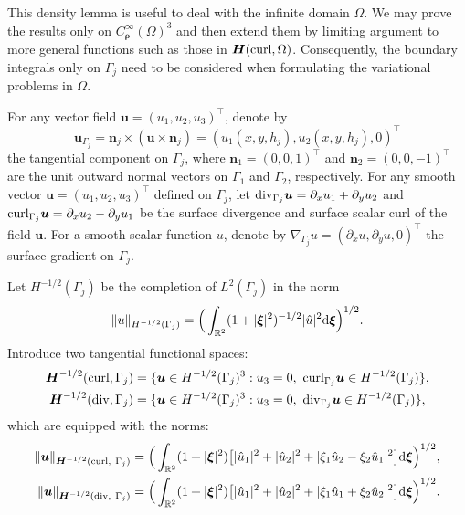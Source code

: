 \documentclass[11pt,reqno]{amsart}
\numberwithin{equation}{section}
\begin{document}
This density lemma is useful to deal with the infinite domain $\Omega$. We may
prove the results only on $ C_{\boldsymbol \rho}^{\infty} (\Omega)^3$ and then
extend them by limiting argument to more general functions such as those in
$\boldsymbol H (\rm curl, \Omega)$. Consequently, the boundary integrals only
on $\Gamma_j$ need to be considered when formulating the variational problems in
$\Omega$.

For any vector field $\boldsymbol u= (u_1, u_2, u_3)^{\top}$, denote by
\[
\boldsymbol u_{\Gamma_j}= \boldsymbol n_j \times( \boldsymbol u \times
\boldsymbol n_j)=(u_1 (x, y, h_j), u_2 (x, y, h_j), 0)^\top
\]
the tangential component on $\Gamma_j$, where $\boldsymbol n_1=(0, 0, 1)^\top$
and $\boldsymbol n_2=(0, 0, -1)^\top$ are the unit outward normal vectors on
$\Gamma_1$ and $\Gamma_2$, respectively. For any smooth vector
$\boldsymbol u=(u_1, u_2, u_3)^\top$ defined on $\Gamma_j$, let ${\rm div
}_{\Gamma_j} \boldsymbol u =\partial_x u_1+\partial_y u_2$ and ${\rm
curl}_{\Gamma_j} \boldsymbol u =\partial_x u_2 -\partial_y u_1$ be the surface
divergence and surface scalar curl of the field $\boldsymbol u$. For a smooth
scalar function $u$, denote by $\nabla_{\Gamma_j} u =(\partial_x u, \partial_y
u, 0)^{\top} $ the surface gradient on $\Gamma_j$. 

Let $H^{-1/2} (\Gamma_j)$ be the completion of $L^2(\Gamma_j)$ in the norm 
\begin{align*}
\|u\|_{H^{-1/2}(\Gamma_j)} =\Big(\int_{\mathbb R^2}(1+|\boldsymbol
\xi|^2)^{-1/2} |\hat u|^2 {\rm d} \boldsymbol \xi\Big)^{1/2}.
\end{align*}
Introduce two tangential functional spaces:
\begin{align*}
\boldsymbol H^{-1/2}({\rm curl}, \Gamma_j) &=\{ \boldsymbol u \in H^{-1/2}
(\Gamma_j)^3: u_3=0, ~{\rm curl }_{\Gamma_j} \boldsymbol u \in H^{-1/2}
(\Gamma_j)\},\\
\boldsymbol H^{-1/2}({\rm div}, \Gamma_j) &=\{ \boldsymbol u \in
H^{-1/2}(\Gamma_j)^3: u_3=0, ~{\rm div}_{\Gamma_j} \boldsymbol u \in H^{-1/2}
(\Gamma_j)\},
\end{align*}
which are equipped with the norms: 
\begin{align*}
\|\boldsymbol u\|_{\boldsymbol H^{-1/2}({\rm curl},
~\Gamma_j)}&=\Big(\int_{\mathbb R^2} (1+|\boldsymbol \xi|^2)\big[ |\hat u_1|^2
+|\hat u_2|^2 +|\xi_1 \hat u_2 -\xi_2 \hat u_1|^2\big] {\rm d} \boldsymbol
\xi\Big)^{1/2},\\
\| \boldsymbol u\|_{\boldsymbol H^{-1/2} ({\rm div},~
\Gamma_j)}&=\Big(\int_{\mathbb R^2} (1+|\boldsymbol \xi|^2)\big[ |\hat u_1|^2
+|\hat u_2|^2 +|\xi_1 \hat u_1 +\xi_2 \hat u_2|^2\big] {\rm d} \boldsymbol
\xi\Big)^{1/2}. 
\end{align*}
\end{document}
